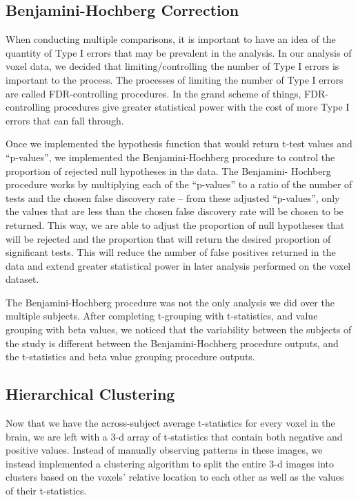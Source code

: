
\subsection{Benjamini-Hochberg Correction}

\par \indent When conducting multiple comparisons, it is important to have an 
idea of the quantity of Type I errors that may be prevalent in the analysis. 
In our analysis of voxel data, we decided that limiting/controlling the number 
of Type I errors is important to the process. The processes of limiting the 
number of Type I errors are called FDR-controlling procedures. In the grand 
scheme of things, FDR-controlling procedures give greater statistical power 
with the cost of more Type I errors that can fall through. 

\par Once we implemented the hypothesis function that would return t-test 
values and ``p-values'', we implemented the Benjamini-Hochberg procedure to 
control the proportion of rejected null hypotheses in the data. The Benjamini-
Hochberg procedure works by multiplying each of the ``p-values'' to a ratio of 
the number of tests and the chosen false discovery rate -- from these adjusted 
``p-values'', only the values that are less than the chosen false discovery rate 
will be chosen to be returned. This way, we are able to adjust the proportion of 
null hypotheses that will be rejected and the proportion that will return the 
desired proportion of significant tests. This will reduce the number of false 
positives returned in the data and extend greater statistical power in later 
analysis performed on the voxel dataset.

\par The Benjamini-Hochberg procedure was not the only analysis we did over the
multiple subjects. After completing t-grouping with t-statistics, and value 
grouping with beta values, we noticed that the variability between the subjects
of the study is different between the Benjamini-Hochberg procedure outputs, and
the t-statistics and beta value grouping procedure outputs.

\subsection{Hierarchical Clustering}

\par Now that we have the across-subject average t-statistics for every voxel 
in the brain, we are left with a 3-d array of t-statistics that contain both 
negative and positive values. Instead of manually observing patterns in these 
images, we instead implemented a clustering algorithm to split the entire 3-d 
images into clusters based on the voxels' relative location to each other as 
well as the values of their t-statistics.

